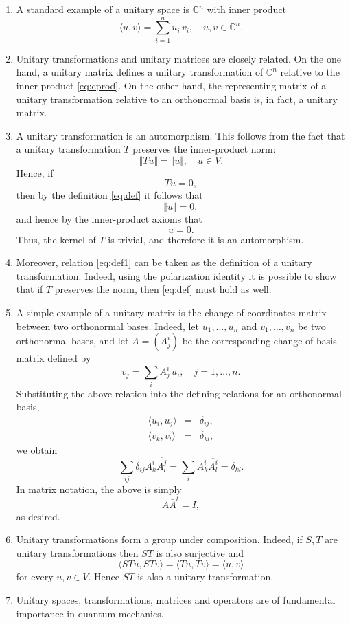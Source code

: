 \documentclass{article}
\newcommand{\cnums}{\mathbb{C}}
\begin{document}
\begin{enumerate}
\item 

A standard example of a unitary space is
$\cnums^n$ with inner product
\begin{equation}
  \label{eq:cprod}
  \langle u,v \rangle = \sum_{i=1}^n u_i\, \overline{v_i},\quad
  u,v \in\cnums^n.  
\end{equation}


\item Unitary transformations and unitary matrices
are closely related.  On the one hand, a unitary matrix defines a
unitary transformation of $\cnums^n$ relative to the inner product
\eqref{eq:cprod}.  On the other hand, the representing matrix of a
unitary transformation relative to an orthonormal basis is, in fact, a
unitary matrix.

\item A unitary transformation is an automorphism.  This follows from
  the fact that a unitary transformation $T$ preserves the
  inner-product norm:
  \begin{equation}
    \label{eq:def1}
    \Vert T u \Vert= \Vert u\Vert,\quad u\in V.    
  \end{equation}
  Hence, if $$Tu=0,$$
  then by  the definition \eqref{eq:def}
  it follows that  
  $$\Vert u \Vert = 0,$$
  and hence by the inner-product axioms that 
  $$u=0.$$
  Thus, the kernel of $T$ is trivial, and therefore it is an
  automorphism.
\item Moreover, relation \eqref{eq:def1} can be taken as the definition
  of a unitary transformation.  Indeed, using the polarization
  identity it is possible to show that if
  $T$ preserves the norm, then \eqref{eq:def} must hold as well.


\item A simple example of a unitary matrix is the change of
  coordinates matrix between two orthonormal bases.  Indeed, let
  $u_1,\ldots, u_n$ and $v_1,\ldots,v_n$ be two orthonormal bases, and
  let $A=(A^i_j)$ be the corresponding change of basis matrix
  defined by
$$v_j = \sum_i A^i_j\, u_i,\quad j=1,\ldots, n.$$
Substituting the above relation into the defining relations for an
orthonormal basis,
\begin{eqnarray*}
\langle u_i,u_j\rangle &=& \delta_{ij},\\
\langle v_k,v_l\rangle &=& \delta_{kl},  
\end{eqnarray*}
we obtain
$$\sum_{ij} \delta_{ij} A^i_k \overline{A^j_l}  = \sum_i A^i_k \overline{A^i_l} =
\delta_{kl}.$$
In matrix notation, the above is simply
$$A \bar{A}^t = I,$$
as desired.
\item Unitary transformations form a group under composition. Indeed, if $S, T$ are unitary transformations then $ST$ is also surjective and
\begin{displaymath}
\langle STu, STv \rangle = \langle Tu, Tv\rangle = \langle u, v\rangle
\end{displaymath}
for every $u,v \in V$. Hence $ST$ is also a unitary transformation.
\item Unitary spaces, transformations, matrices and operators are of fundamental
  importance in quantum mechanics.
\end{enumerate}
\end{document}
